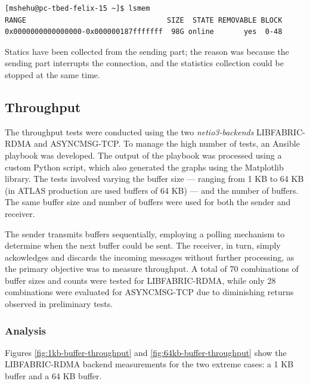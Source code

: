 \begin{lstlisting}[caption={Memory information}, label={lst:memory}]
[mshehu@pc-tbed-felix-15 ~]$ lsmem
RANGE                                 SIZE  STATE REMOVABLE BLOCK
0x0000000000000000-0x000000187fffffff  98G online       yes  0-48
\end{lstlisting}

Statics have been collected from the sending part; the reason was because the sending part interrupts the connection, and the statistics collection could be stopped at the same time.

\subsection{Throughput}

The throughput tests were conducted using the two \textit{netio3-backends} LIBFABRIC-RDMA and ASYNCMSG-TCP. To manage the high number of tests, an Ansible \cite{ansible} playbook was developed. The output of the playbook was processed using a custom Python script, which also generated the graphs using the Matplotlib \cite{matplotlib} library. The tests involved varying the buffer size --- ranging from 1 KB to 64 KB  (in ATLAS production are used buffers of 64 KB) --- and the number of buffers. The same buffer size and number of buffers were used for both the sender and receiver. 

The sender transmits buffers sequentially, employing a polling mechanism to determine when the next buffer could be sent. The receiver, in turn, simply ackowledges and discards the incoming messages without further processing, as the primary objective was to measure throughput. A total of 70 combinations of buffer sizes and counts were tested for LIBFABRIC-RDMA, while only 28 combinations were evaluated for ASYNCMSG-TCP due to diminishing returns observed in preliminary tests.

\subsubsection{Analysis}

Figures \ref{fig:1kb-buffer-throughput} and \ref{fig:64kb-buffer-throughput} show the LIBFABRIC-RDMA backend measurements for the two extreme cases: a 1 KB buffer and a 64 KB buffer.

